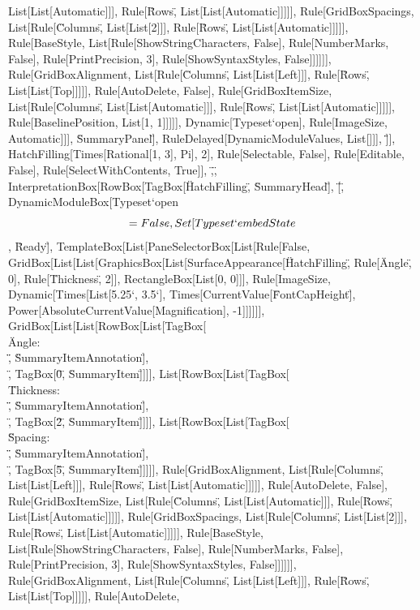 \documentclass{article}
\begin{document}
{{{{List[List[Automatic]]], Rule[\"Rows\", List[List[Automatic]]]]], Rule[GridBoxSpacings, List[Rule[\"Columns\", List[List[2]]], Rule[\"Rows\", List[List[Automatic]]]]],
Rule[BaseStyle, List[Rule[ShowStringCharacters, False], Rule[NumberMarks, False], Rule[PrintPrecision, 3], Rule[ShowSyntaxStyles, False]]]]]], Rule[GridBoxAlignment,
List[Rule[\"Columns\", List[List[Left]]], Rule[\"Rows\", List[List[Top]]]]], Rule[AutoDelete, False], Rule[GridBoxItemSize, List[Rule[\"Columns\",
List[List[Automatic]]], Rule[\"Rows\", List[List[Automatic]]]]], Rule[BaselinePosition, List[1, 1]]]]], Dynamic[Typeset`open$$], Rule[ImageSize,
Automatic]]], \"SummaryPanel\"], RuleDelayed[DynamicModuleValues, List[]]], \"]\"}], HatchFilling[Times[Rational[1, 3], Pi], 2], Rule[Selectable,
False], Rule[Editable, False], Rule[SelectWithContents, True]], \",\", InterpretationBox[RowBox[{TagBox[\"HatchFilling\", \"SummaryHead\"], \"[\",
DynamicModuleBox[{Typeset`open$$ = False, Set[Typeset`embedState$$, \"Ready\"]}, TemplateBox[List[PaneSelectorBox[List[Rule[False, GridBox[List[List[GraphicsBox[List[SurfaceAppearance[\"HatchFilling\",
Rule[\"Angle\", 0], Rule[\"Thickness\", 2]], RectangleBox[List[0, 0]]], Rule[ImageSize, Dynamic[Times[List[5.25`, 3.5`], Times[CurrentValue[\"FontCapHeight\"],
Power[AbsoluteCurrentValue[Magnification], -1]]]]]], GridBox[List[List[RowBox[List[TagBox[\"\\\"Angle: \\\"\", \"SummaryItemAnnotation\"], \"\\[InvisibleSpace]\",
TagBox[\"0\", \"SummaryItem\"]]]], List[RowBox[List[TagBox[\"\\\"Thickness: \\\"\", \"SummaryItemAnnotation\"], \"\\[InvisibleSpace]\", TagBox[\"2\",
\"SummaryItem\"]]]], List[RowBox[List[TagBox[\"\\\"Spacing: \\\"\", \"SummaryItemAnnotation\"], \"\\[InvisibleSpace]\", TagBox[\"5\", \"SummaryItem\"]]]]],
Rule[GridBoxAlignment, List[Rule[\"Columns\", List[List[Left]]], Rule[\"Rows\", List[List[Automatic]]]]], Rule[AutoDelete, False], Rule[GridBoxItemSize,
List[Rule[\"Columns\", List[List[Automatic]]], Rule[\"Rows\", List[List[Automatic]]]]], Rule[GridBoxSpacings, List[Rule[\"Columns\", List[List[2]]],
Rule[\"Rows\", List[List[Automatic]]]]], Rule[BaseStyle, List[Rule[ShowStringCharacters, False], Rule[NumberMarks, False], Rule[PrintPrecision, 3],
Rule[ShowSyntaxStyles, False]]]]]], Rule[GridBoxAlignment, List[Rule[\"Columns\", List[List[Left]]], Rule[\"Rows\", List[List[Top]]]]], Rule[AutoDelete,
}}}}
\end{document}
